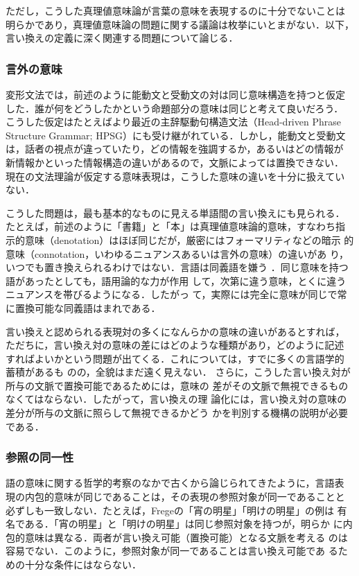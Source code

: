 ただし，こうした真理値意味論が言葉の意味を表現するのに十分でないことは
明らかであり，真理値意味論の問題に関する議論は枚挙にいとまがない．以下，
言い換えの定義に深く関連する問題について論じる．

\subsubsection{言外の意味}

変形文法では，前述のように能動文と受動文の対は同じ意味構造を持つと仮定
した．誰が何をどうしたかという命題部分の意味は同じと考えて良いだろう．
こうした仮定はたとえばより最近の主辞駆動句構造文法（Head-driven Phrase
Structure Grammar; HPSG）にも受け継がれている．しかし，能動文と受動文
は，話者の視点が違っていたり，どの情報を強調するか，あるいはどの情報が
新情報かといった情報構造の違いがあるので，文脈によっては置換できない．
現在の文法理論が仮定する意味表現は，こうした意味の違いを十分に扱えてい
ない．

こうした問題は，最も基本的なものに見える単語間の言い換えにも見られる．
たとえば，前述のように「書籍」と「本」は真理値意味論的意味，すなわち指
示的意味（denotation）はほぼ同じだが，厳密にはフォーマリティなどの暗示
的意味（connotation，いわゆるニュアンスあるいは言外の意味）の違いがあ
り，いつでも置き換えられるわけではない．言語は同義語を嫌う
\cite{clark:92}．同じ意味を持つ語があったとしても，語用論的な力が作用
して，次第に違う意味，とくに違うニュアンスを帯びるようになる．したがっ
て，実際には完全に意味が同じで常に置換可能な同義語はまれである．

言い換えと認められる表現対の多くになんらかの意味の違いがあるとすれば，
ただちに，言い換え対の意味の差にはどのような種類があり，どのように記述
すればよいかという問題が出てくる．これについては，すでに多くの言語学的
蓄積\cite{halliday:94,miyajima:95:a,miyajima:95:b,kageyama:01}があるも
のの，全貌はまだ遠く見えない．
さらに，こうした言い換え対が所与の文脈で置換可能であるためには，意味の
差がその文脈で無視できるものなくてはならない．したがって，言い換えの理
論化には，言い換え対の意味の差分が所与の文脈に照らして無視できるかどう
かを判別する機構の説明が必要である．

\subsubsection{参照の同一性}

語の意味に関する哲学的考察のなかで古くから論じられてきたように，言語表
現の内包的意味が同じであることは，その表現の参照対象が同一であることと
必ずしも一致しない．たとえば，Fregeの「宵の明星」「明けの明星」の例は
有名である．「宵の明星」と「明けの明星」は同じ参照対象を持つが，明らか
に内包的意味は異なる．両者が言い換え可能（置換可能）となる文脈を考える
のは容易でない．このように，参照対象が同一であることは言い換え可能であ
るための十分な条件にはならない．

